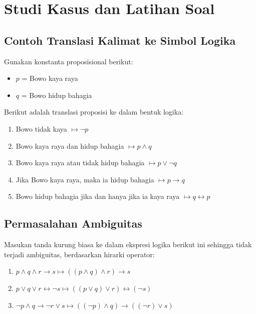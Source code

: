 \section{Studi Kasus dan Latihan Soal}
\subsection{Contoh Translasi Kalimat ke Simbol Logika}
Gunakan konstanta proposisional berikut:
\begin{itemize}
	\item $p$ = Bowo kaya raya
	\item $q$ = Bowo hidup bahagia
\end{itemize}

Berikut adalah translasi proposisi ke dalam bentuk logika:
\begin{enumerate}
	\item Bowo tidak kaya $\mapsto \neg p$
	\item Bowo kaya raya dan hidup bahagia $\mapsto p \wedge q$
	\item Bowo kaya raya atau tidak hidup bahagia $\mapsto p \vee \neg q$
	\item Jika Bowo kaya raya, maka ia hidup bahagia $\mapsto p \rightarrow q$
	\item Bowo hidup bahagia jika dan hanya jika ia kaya raya $\mapsto q \leftrightarrow p$
\end{enumerate}

\subsection{Permasalahan Ambiguitas}
Masukan tanda kurung biasa ke dalam ekspresi logika berikut ini sehingga tidak terjadi ambiguitas, berdasarkan hirarki operator:
\begin{enumerate}
	\item $p \wedge q \wedge r \rightarrow s \mapsto ((p \wedge q) \wedge r) \rightarrow s$
	\item $p \vee q \vee r \leftrightarrow \neg s \mapsto ((p \vee q) \vee r) \leftrightarrow (\neg s)$
	\item $\neg p \wedge q \rightarrow \neg r \vee s \mapsto ((\neg p) \wedge q) \rightarrow ((\neg r) \vee s)$	
\end{enumerate}
